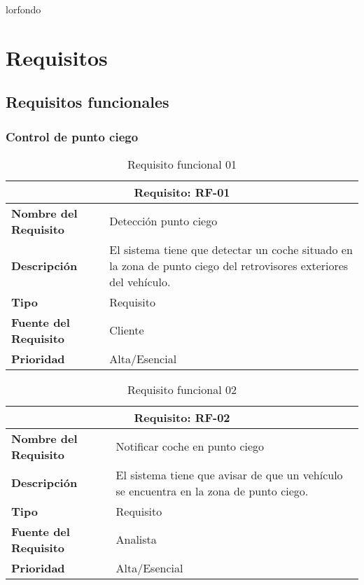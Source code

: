 \documentclass[10pt,a4paper,oldfontcommands]{dpds}
\begin{document}
\pageco
lor{fondo}
\color{principal}


\section{Requisitos}
\subsection{Requisitos funcionales}


\subsubsection{Control de punto ciego}

\begin{table}[H]
\begin{center}
\begin{tabular}{p{} p{7cm}}
\multicolumn{2}{c}{\textbf{Requisito: RF-01} } \\
\hline \hline
\textbf{Nombre del Requisito} & Detección punto ciego  \\
\hline
\textbf{Descripción} & El sistema tiene que detectar un coche situado en la zona de punto ciego del retrovisores exteriores del vehículo.  \\
\hline
\textbf{Tipo} & Requisito  \\
\hline
\textbf{Fuente del Requisito} & Cliente  \\
\hline
\textbf{Prioridad} & Alta/Esencial  \\ \hline
\end{tabular}
\caption{Requisito funcional 01}
\label{tab:personal}
\end{center}
\end{table}

\begin{table}[H]
\begin{center}
\begin{tabular}{p{} p{7cm}}
\multicolumn{2}{c}{\textbf{Requisito: RF-02} } \\
\hline \hline
\textbf{Nombre del Requisito} & Notificar coche en punto ciego  \\
\hline
\textbf{Descripción} & El sistema tiene que avisar de que un vehículo se encuentra en la zona de punto ciego. \\
\hline
\textbf{Tipo} & Requisito  \\
\hline
\textbf{Fuente del Requisito} & Analista  \\
\hline
\textbf{Prioridad} & Alta/Esencial  \\ \hline
\end{tabular}
\caption{Requisito funcional 02}
\label{tab:personal}
\end{center}
\end{table}
\end{document}
